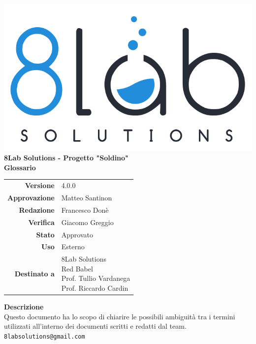 \thispagestyle{empty}
\begin{titlepage}
	\begin{center}
		\includegraphics[scale = 0.3]{res/images/logo8_crop.png}\\
		\large \textbf{8Lab Solutions - Progetto "Soldino"} \\
		\vfill
		\Huge \textbf{Glossario}
		\vspace*{\fill} 
        \vfill
        \large
        \begin{tabular}{r|l}
                        \textbf{Versione} & 4.0.0\\
                        \textbf{Approvazione} & Matteo Santinon\\
                        \textbf{Redazione} & Francesco Donè \\
                        \textbf{Verifica} & Giacomo Greggio\\
                        \textbf{Stato} & Approvato\\
                        \textbf{Uso} & Esterno\\
                        \textbf{Destinato a} & \parbox[t]{5cm}{8Lab Solutions\\ Red Babel\\Prof. Tullio Vardanega\\Prof. Riccardo Cardin}
                \end{tabular}
                \vfill
                \normalsize
                \textbf{Descrizione}\\
                Questo documento ha lo scopo di chiarire le possibili ambiguità tra i termini utilizzati all'interno dei documenti scritti e redatti dal team.\\
                \vfill
                \small
                \texttt{8labsolutions@gmail.com}
	\end{center}
\end{titlepage}
